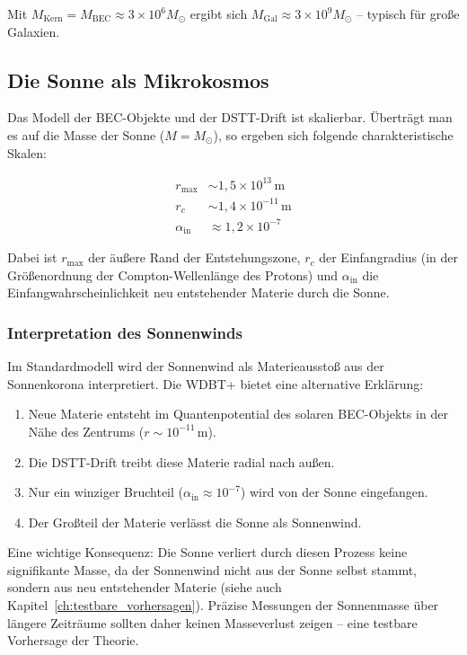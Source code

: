 Mit \( M_{\text{Kern}} = M_{\text{BEC}} \approx 3 \times 10^6 M_\odot \) ergibt sich \( M_{\text{Gal}} \approx 3 \times 10^9 M_\odot \) – typisch für große Galaxien.

\subsection{Die Sonne als Mikrokosmos}
\label{sub:kosmo_sonne}

Das Modell der BEC-Objekte und der DSTT-Drift ist skalierbar. 
Überträgt man es auf die Masse der Sonne (\( M = M_{\odot} \)), 
so ergeben sich folgende charakteristische Skalen:

\begin{align}
r_{\text{max}} &\sim 1,5 \times 10^{13} \, \text{m} \tag{14.20} \\
r_c &\sim 1,4 \times 10^{-11} \, \text{m} \tag{14.21} \\
\alpha_{\text{in}} &\approx 1,2 \times 10^{-7} \tag{14.22}
\end{align}

Dabei ist \( r_{\text{max}} \) der äußere Rand der Entstehungszone, 
\( r_c \) der Einfangradius (in der Größenordnung der 
Compton-Wellenlänge des Protons) und \( \alpha_{\text{in}} \) die 
Einfangwahrscheinlichkeit neu entstehender Materie durch die Sonne.

\subsubsection{Interpretation des Sonnenwinds}
\label{sub:kosmo_sonnenwind}

Im Standardmodell wird der Sonnenwind als Materieausstoß aus der 
Sonnenkorona interpretiert. Die WDBT+ bietet eine alternative 
Erklärung:

\begin{enumerate}
    \item Neue Materie entsteht im Quantenpotential des solaren 
          BEC-Objekts in der Nähe des Zentrums (\( r \sim 10^{-11} \, \text{m} \)).
    \item Die DSTT-Drift treibt diese Materie radial nach außen.
    \item Nur ein winziger Bruchteil (\( \alpha_{\text{in}} \approx 10^{-7} \)) 
          wird von der Sonne eingefangen.
    \item Der Großteil der Materie verlässt die Sonne als Sonnenwind.
\end{enumerate}

Eine wichtige Konsequenz: Die Sonne verliert durch diesen Prozess 
keine signifikante Masse, da der Sonnenwind nicht aus der Sonne 
selbst stammt, sondern aus neu entstehender Materie (siehe auch Kapitel~\ref{ch:testbare_vorhersagen}). 
Präzise Messungen der Sonnenmasse über längere Zeiträume 
sollten daher keinen Masseverlust zeigen – eine testbare 
Vorhersage der Theorie.

